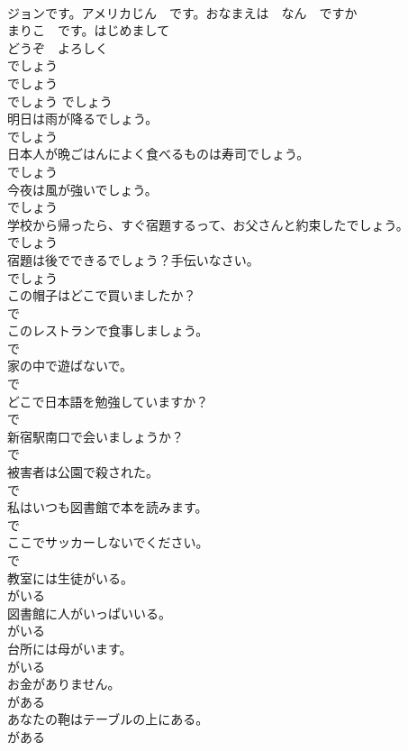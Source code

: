 \documentclass[8pt]{extreport}
\begin{document}
\begin{CJK}{UTF8}{min}
\\	ジョンです。アメリカじん　です。おなまえは　なん　ですか	
\\	まりこ　です。はじめまして	
\\	どうぞ　よろしく	
\\	でしょう	
\\	でしょう	
\\	でしょう	でしょう
\\	明日は雨が降るでしょう。	
\\	でしょう
\\	日本人が晩ごはんによく食べるものは寿司でしょう。	
\\	でしょう
\\	今夜は風が強いでしょう。	
\\	でしょう
\\	学校から帰ったら、すぐ宿題するって、お父さんと約束したでしょう。	
\\	でしょう
\\	宿題は後でできるでしょう？手伝いなさい。	
\\	でしょう
\\	この帽子はどこで買いましたか？	
\\	で
\\	このレストランで食事しましょう。	
\\	で
\\	家の中で遊ばないで。	
\\	で
\\	どこで日本語を勉強していますか？	
\\	で
\\	新宿駅南口で会いましょうか？	
\\	で
\\	被害者は公園で殺された。	
\\	で
\\	私はいつも図書館で本を読みます。	
\\	で
\\	ここでサッカーしないでください。	
\\	で
\\	教室には生徒がいる。	
\\	がいる
\\	図書館に人がいっぱいいる。	
\\	がいる
\\	台所には母がいます。	
\\	がいる
\\	お金がありません。	
\\	がある
\\	あなたの鞄はテーブルの上にある。	
\\	がある

\end{CJK}
\end{document}
